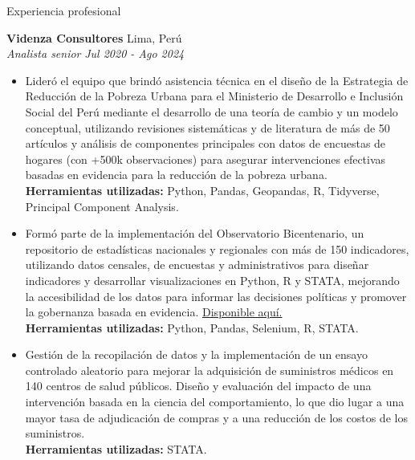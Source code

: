 \documentclass{resume} %
\begin{document}
\begin{rSection}{Experiencia profesional}

    \textbf{Videnza Consultores} \hfill Lima, Perú \\
    \textit{Analista senior} \hfill \textit{Jul 2020 - Ago 2024}
     \begin{itemize}
        \itemsep -3pt {} 
         \item Lideró el equipo que brindó asistencia técnica en el diseño de la Estrategia de Reducción de la Pobreza Urbana para el Ministerio de Desarrollo e Inclusión Social del Perú mediante el desarrollo de una teoría de cambio y un modelo conceptual, utilizando revisiones sistemáticas y de literatura de más de 50 artículos y análisis de componentes principales con datos de encuestas de hogares (con +500k observaciones) para asegurar intervenciones efectivas basadas en evidencia para la reducción de la pobreza urbana. \\ \textbf{Herramientas utilizadas:} Python, Pandas, Geopandas, R, Tidyverse, Principal Component Analysis. 
         \item Formó parte de la implementación del Observatorio Bicentenario, un repositorio de estadísticas nacionales y regionales con más de 150 indicadores, utilizando datos censales, de encuestas y administrativos para diseñar indicadores y desarrollar visualizaciones en Python, R y STATA, mejorando la accesibilidad de los datos para informar las decisiones políticas y promover la gobernanza basada en evidencia. \href{https://propuestasdelbicentenario.pe/observatorio/}{Disponible aquí.} \\ \textbf{Herramientas utilizadas:} Python, Pandas, Selenium, R, STATA.
         \item Gestión de la recopilación de datos y la implementación de un ensayo controlado aleatorio para mejorar la adquisición de suministros médicos en 140 centros de salud públicos. Diseño y evaluación del impacto de una intervención basada en la ciencia del comportamiento, lo que dio lugar a una mayor tasa de adjudicación de compras y a una reducción de los costos de los suministros. \\ \textbf{Herramientas utilizadas:} STATA.
     \end{itemize}
     

\end{rSection}
\end{document}

